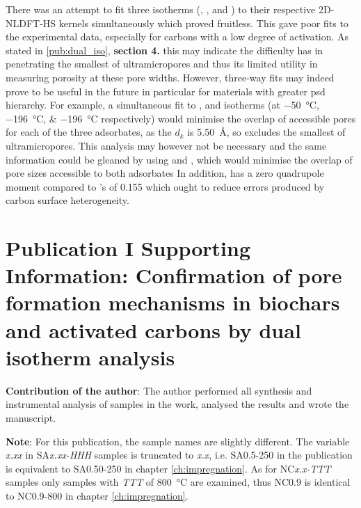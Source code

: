 There was an attempt to fit three isotherms (, , and ) to their respective 2D-NLDFT-HS kernels simultaneously which proved fruitless. This gave poor fits to the experimental data, especially for carbons with a low degree of activation. As stated in \ref{pub:dual_iso}, \textbf{section 4.} this may indicate the difficulty  has in penetrating the smallest of \glspl{ultramicropore} and thus its limited utility in measuring porosity at these pore widths. However, three-way fits may indeed prove to be useful in the future in particular for materials with greater \acrshort{psd} hierarchy. For example, a simultaneous fit to ,  and  isotherms (at \qtylist[list-units=single]{-50;-196;-196}{\degreeCelsius} respectively) would minimise the overlap of accessible pores for each of the three \glspl{adsorbate}, as the $d_k$ is \qty{5.50}{\angstrom}, so excludes the smallest of \glspl{ultramicropore}. This analysis may however not be necessary and the same information could be gleaned by using  and , which would minimise the overlap of pore sizes accessible to both \glspl{adsorbate} In addition,  has a zero quadrupole moment compared to 's of 0.155 which ought to reduce errors produced by carbon surface heterogeneity.


\newpage
\section[Publication I Supporting Information]{Publication I Supporting Information: Confirmation of pore formation mechanisms in biochars and activated carbons by dual isotherm analysis}

\textbf{Contribution of the author}: The author performed all synthesis and instrumental analysis of samples in the work, analysed the results and wrote the manuscript.

\textbf{Note}: For this publication, the sample names are slightly different. The variable \textit{x.xx} in SA\textit{x.xx-HHH} samples is truncated to \textit{x.x}, i.e. SA0.5-250 in the publication is equivalent to SA0.50-250 in chapter \ref{ch:impregnation}. As for NC\textit{x.x-TTT} samples only samples with \textit{TTT} of \qty{800}{\degreeCelsius} are examined, thus NC0.9 is identical to NC0.9-800 in chapter \ref{ch:impregnation}.
\setcounter{opagenum}{\thepage}
\newpage

\setlength{\originalVOffset}{\voffset}   
\setlength{\originalHOffset}{\hoffset}

\setlength{\voffset}{0cm}
\setlength{\hoffset}{0cm}

\setlength{\voffset}{\originalVOffset}
\setlength{\hoffset}{\originalHOffset}


